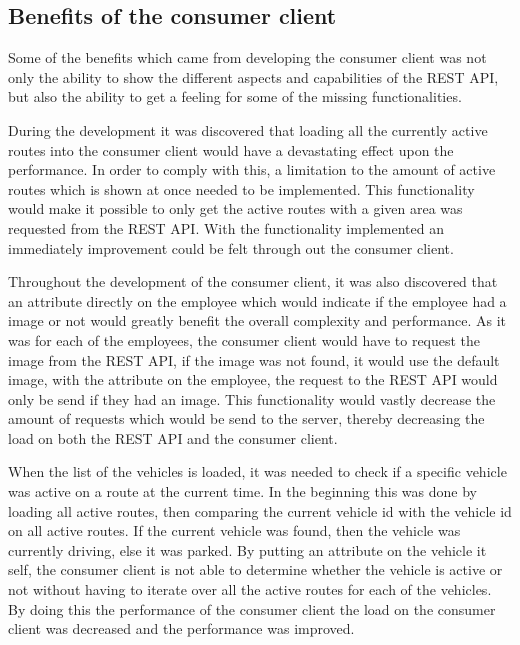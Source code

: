 \subsection{Benefits of the consumer client}\label{ssec:benefits_consumer_client}
Some of the benefits which came from developing the consumer client was not only the ability to show the different aspects and capabilities of the REST API, but also the ability to get a feeling for some of the missing functionalities.

\bigskip
{}
During the development it was discovered that loading all the currently active routes into the consumer client would have a devastating effect upon the performance.
In order to comply with this, a limitation to the amount of active routes which is shown at once needed to be implemented.
This functionality would make it possible to only get the active routes with a given area was requested from the REST API.
With the functionality implemented an immediately improvement could be felt through out the consumer client.

\bigskip
{}
Throughout the development of the consumer client, it was also discovered that an attribute directly on the employee which would indicate if the employee had a image or not would greatly benefit the overall  complexity and performance.
As it was for each of the employees, the consumer client would have to request the image from the REST API, if the image was not found, it would use the default image, with the attribute on the employee, the request to the REST API would only be send if they had an image.
This functionality would vastly decrease the amount of requests which would be send to the server, thereby decreasing the load on both the REST API and the consumer client.

\bigskip
{}
When the list of the vehicles is loaded, it was needed to check if a specific vehicle was active on a route at the current time.
In the beginning this was done by loading all active routes, then comparing the current vehicle id with the vehicle id on all active routes.
If the current vehicle was found, then the vehicle was currently driving, else it was parked.
By putting an attribute on the vehicle it self, the consumer client is not able to determine whether the vehicle is active or not without having to iterate over all the active routes for each of the vehicles.
By doing this the performance of the consumer client the load on the consumer client was decreased and the performance was improved.

